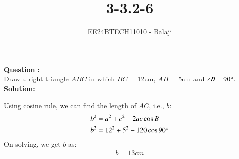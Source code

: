 \documentclass[journal]{IEEEtran}
\begin{document}

\vspace{3cm}

\title{3-3.2-6}
\author{EE24BTECH11010 - Balaji}
{\let\newpage\relax\maketitle}

\renewcommand{\thefigure}{\theenumi}
\renewcommand{\thetable}{\theenumi}
\setlength{\intextsep}{10pt} %

\renewcommand{\thetable}{\theenumi}

\textbf{Question :} \\
Draw a right triangle $ABC$ in which $BC$ = 12cm, $AB$ = 5cm and $\angle{B} = 90\degree$.\\
\textbf{Solution:}

\begin{table}[h!]
      \centering
      
      \caption{}
\end{table}
Using cosine rule, we can find the length of $AC$, i.e., ${b}$:
\begin{align}
    b^2 &= a^2 + c^2 - 2ac\cos{B}\\
    b^2 &= 12^2 + 5^2 - 120\cos{90\degree}
\end{align}
On solving, we get ${b}$ as:
\begin{align}
    {b} = 13cm
\end{align}
\end{document}
